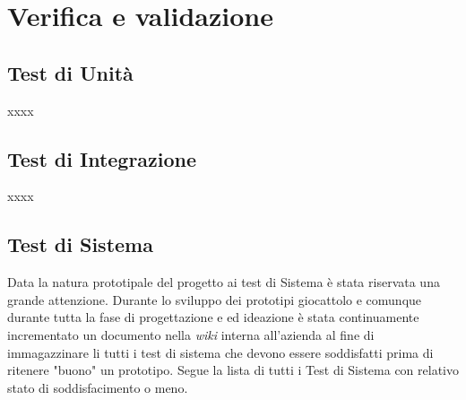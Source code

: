 
\chapter{Verifica e validazione}
\label{cap:verifica-validazione}

\section{Test di Unità}
xxxx
\section{Test di Integrazione}
xxxx
\section{Test di Sistema}
Data la natura prototipale del progetto ai test di Sistema è stata riservata una grande attenzione. Durante lo sviluppo dei prototipi giocattolo e comunque durante tutta la fase di progettazione e ed ideazione è stata continuamente incrementato un documento nella \emph{wiki} interna all'azienda al fine di immagazzinare li tutti i test di sistema che devono essere soddisfatti prima di ritenere "buono" un prototipo.
Segue la lista di tutti i Test di Sistema con relativo stato di soddisfacimento o meno.
